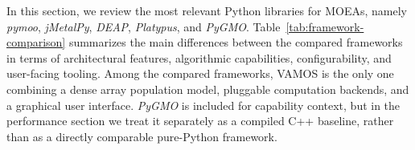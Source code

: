 \documentclass[final,5p,times,twocolumn]{elsarticle}
\newcommand{\VAMOS}{VAMOS}
\begin{document}
In this section, we review the most relevant Python libraries for MOEAs, namely \textit{pymoo}, \textit{jMetalPy}, \textit{DEAP}, \textit{Platypus}, and \textit{PyGMO}. Table~\ref{tab:framework-comparison} summarizes the main differences between the compared frameworks in terms of architectural features, algorithmic capabilities, configurability, and user-facing tooling. Among the compared frameworks, \VAMOS{} is the only one combining a dense array population model, pluggable computation backends, and a graphical user interface. \textit{PyGMO} is included for capability context, but in the performance section we treat it separately as a compiled C++ baseline, rather than as a directly comparable pure-Python framework.
\end{document}
